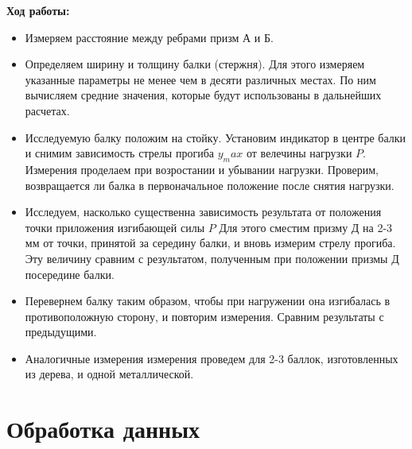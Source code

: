 \documentclass[a4paper,12pt]{article} %
\begin{document}
\textbf{Ход работы:}
\begin{itemize}
\item Измеряем расстояние между ребрами призм А и Б.
\item Определяем ширину и толщину балки (стержня). Для этого измеряем указанные параметры не менее чем в десяти различных местах. По ним вычисляем средние значения, которые будут использованы в дальнейших расчетах.
\item Исследуемую балку положим на стойку. Установим индикатор в центре балки и снимим зависимость стрелы прогиба $y_max$ от велечины нагрузки $P$. Измерения проделаем при возростании и убывании нагрузки. Проверим, возвращается ли балка в первоначальное положение после снятия нагрузки. 
\item Исследуем, насколько существенна зависимость результата от положения точки приложения изгибающей силы $P$ Для этого сместим призму Д на 2-3 мм от точки, принятой за середину балки, и вновь измерим стрелу прогиба. Эту величину сравним с результатом, полученным при положении призмы Д посередине балки.
\item Перевернем балку таким образом, чтобы при нагружении она изгибалась в противоположную сторону, и повторим измерения. Сравним результаты с предыдущими.
\item Аналогичные измерения измерения проведем для 2-3 баллок, изготовленных из дерева, и одной металлической.
\end{itemize}
\section{Обработка данных}
\end{document}
